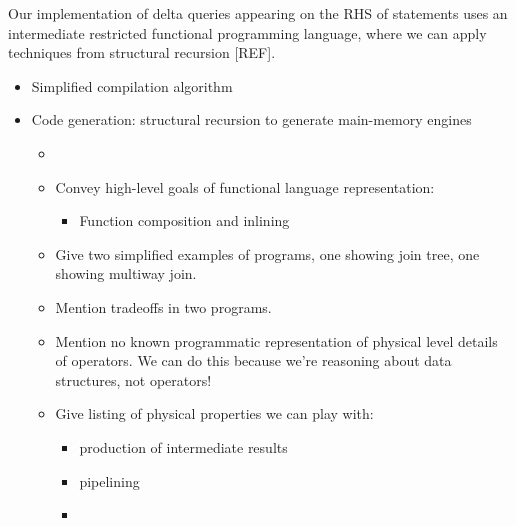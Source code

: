 Our implementation of delta queries appearing on the RHS of statements uses an
intermediate restricted functional programming language, where we can apply
techniques from structural recursion [REF]. 



\begin{itemize}
  \item Simplified compilation algorithm
  \item Code generation: structural recursion to generate main-memory engines
    \begin{itemize}
      \item {}
      \item Convey high-level goals of functional language representation:
        \begin{itemize}
        \item Function composition and inlining
        \end{itemize} 
      \item Give two simplified examples of programs, one showing join tree,
      one showing multiway join.
      \item Mention tradeoffs in two programs.
      \item Mention no known programmatic representation of physical level
      details of operators. We can do this because we're reasoning about data
      structures, not operators!
      \item Give listing of physical properties we can play with:
      \begin{itemize}
        \item production of intermediate results
        \item pipelining
        \item 
      \end{itemize}
    \end{itemize}
\end{itemize}